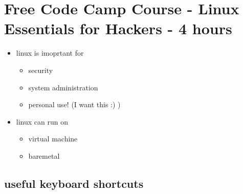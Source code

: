 \documentclass[
]{article}
\author{}
\date{}
\providecommand{\tightlist}{%
  \setlength{\itemsep}{0pt}\setlength{\parskip}{0pt}}
\begin{document}
\hypertarget{free-code-camp-course---linux-essentials-for-hackers---4-hours}{%
\section{Free Code Camp Course - Linux Essentials for Hackers - 4
hours}\label{free-code-camp-course---linux-essentials-for-hackers---4-hours}}

\begin{itemize}
\tightlist
\item
  linux is imoprtant for

  \begin{itemize}
  \tightlist
  \item
    security
  \item
    system administration
  \item
    personal use! (I want this :) )
  \end{itemize}
\item
  linux can run on

  \begin{itemize}
  \tightlist
  \item
    virtual machine
  \item
    baremetal
  \end{itemize}
\end{itemize}

\hypertarget{useful-keyboard-shortcuts}{%
\subsection{useful keyboard shortcuts}\label{useful-keyboard-shortcuts}}
\end{document}
